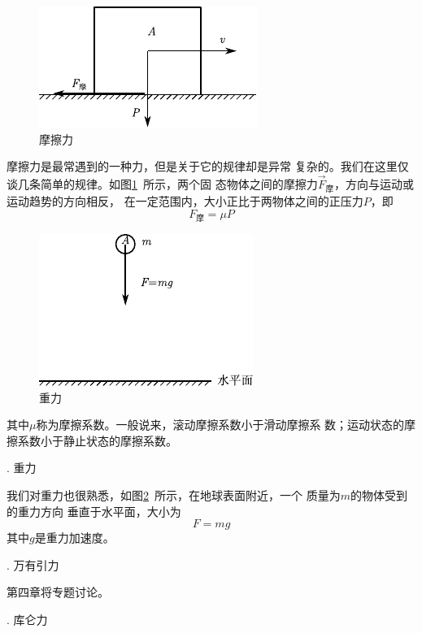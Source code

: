 \begin{figure}
    \includegraphics{figure/fig03.04}
    \caption{摩擦力}
    \label{fig:03.04}
\end{figure}
摩擦力是最常遇到的一种力，但是关于它的规律却是异常
复杂的。我们在这里仅谈几条简单的规律。如图\ref{fig:03.04}~所示，两个固
态物体之间的摩擦力$ \vec{F}_\text{摩} $，方向与运动或运动趋势的方向相反，
在一定范围内，大小正比于两物体之间的正压力$ P $，即\vspace{-0.2em}
\begin{equation}\label{eqn:03.04.02}
    F_\text{摩} = \mu P
\end{equation}

\begin{figure}
    \includegraphics{figure/fig03.05}
    \caption{重力}
    \label{fig:03.05}
\end{figure}
\noindent 其中$\mu$称为摩擦系数。一般说来，滚动摩擦系数小于滑动摩擦系
数；运动状态的摩擦系数小于静止状态的摩擦系数。

. 重力 \normalfont

我们对重力也很熟悉，如图\ref{fig:03.05}~所示，在地球表面附近，一个
质量为$ m $的物体受到的重力方向
垂直于水平面，大小为
\begin{equation}\label{eqn:03.04.03}
    F = m g
\end{equation}
其中$ g $是重力加速度。

. 万有引力 \normalfont

第四章将专题讨论。

. 库仑力 \normalfont

